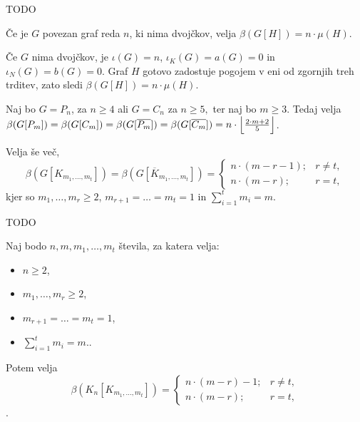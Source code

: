\documentclass[mat1, tisk]{fmfdelo}
\newcommand{\1}{(1, 1, \ldots, 1)}
\newcommand{\2}{(2, 2, \ldots, 2)}
\begin{document}
\begin{dokaz}
    TODO
\end{dokaz}


\begin{izrek}
    Če je $G$ povezan graf reda $n$, ki nima dvojčkov, velja $\beta(G[H]) = n \cdot \mu(H).$
\end{izrek}

\begin{dokaz}
    Če $G$ nima dvojčkov, je $\iota(G) = n$, $\iota_K(G) = a(G) = 0$ in $\iota_N(G) = b(G) = 0.$
    Graf $H$ gotovo zadostuje pogojem v eni od zgornjih treh trditev, zato sledi  
    $\beta(G[H]) = n \cdot \mu(H).$
\end{dokaz}


\begin{izrek}
    Naj bo $G = P_n$, za $n\geq 4$ ali $G = C_n$ za $n \geq 5,$ ter naj bo $m\geq 3.$ Tedaj velja
    $\beta(G[P_m]) = \beta(G[C_m]) = \beta(G[\overline{P_m}]) = \beta(G[\overline{C_m}]) = 
    n \cdot  \Bigl \lfloor \frac{2\cdot m + 2}{5} \Bigr \rfloor $.

    Velja še več, 
    $$\beta(G[K_{m_1, \ldots, m_t}]) = \beta(G[\overline{K}_{m_1, \ldots, m_t}]) = 
    \begin{cases}
        n \cdot (m - r - 1); & r \neq t, \\
        n \cdot (m - r); & r = t, 
    \end{cases} $$
    kjer so $m_1, \ldots, m_r \geq 2$,  $m_{r+1} = \ldots = m_t = 1$ in $\sum_{i= 1}^{t} m_i = m.$
\end{izrek}

\begin{dokaz}
    TODO
\end{dokaz}

\begin{izrek}
    Naj bodo $n, m, m_1, \ldots, m_t$ števila, za katera velja:
    \begin{itemize}
        \item $n \geq 2$,
        \item $m_1, \ldots, m_r \geq 2$,
        \item $m_{r+1} = \ldots = m_t = 1$,
        \item $\sum_{i= 1}^{t} m_i = m.$.
    \end{itemize}
    Potem velja
    $$\beta(K_n[K_{m_1, \ldots, m_t}]) = 
    \begin{cases}
        n \cdot (m - r) - 1; & r \neq t, \\
        n \cdot (m - r); & r = t, 
    \end{cases} $$.
\end{izrek}
\end{document}
